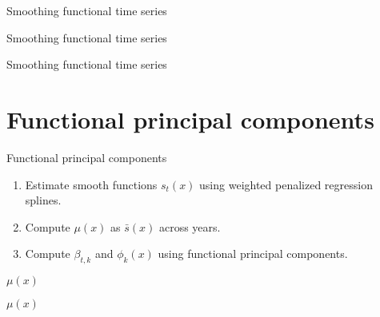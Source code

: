 \documentclass[14pt]{beamer}
\begin{document}
\begin{frame}{\large Smoothing functional time series}


\end{frame}




\begin{frame}{\large Smoothing functional time series}



\end{frame}

\begin{frame}{\large Smoothing functional time series}


\end{frame}


\section{Functional principal components}

%
\begin{frame}{\large Functional principal components}

\pcablock


\begin{enumerate}\itemsep=0.0cm
\item Estimate smooth functions $s_t(x)$ using weighted penalized regression splines.


\item Compute $\mu(x)$ as $\bar{s}(x)$ across years.


\item Compute $\beta_{t,k}$ and $\phi_k(x)$ using functional principal components.


\end{enumerate}
\end{frame}



\begin{frame}{$\mu(x)$}


\end{frame}


\begin{frame}{$\mu(x)$}


\end{frame}
\end{document}
